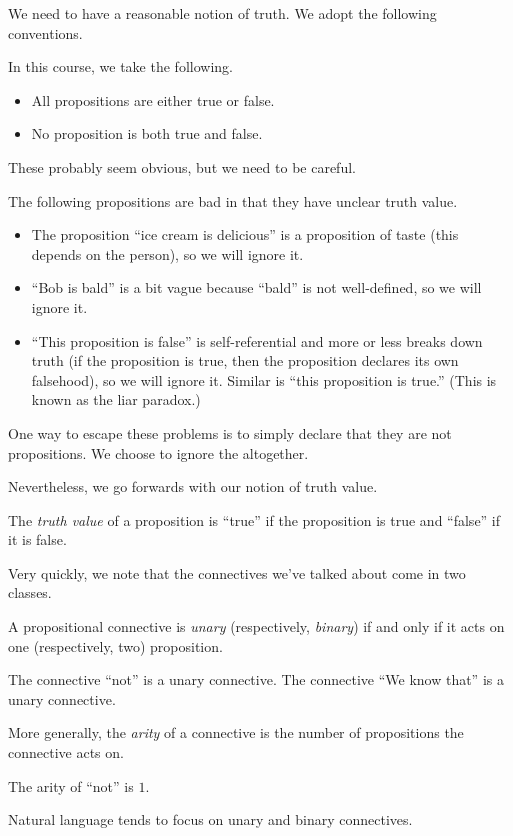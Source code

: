 \documentclass[../notes.tex]{subfiles}
\begin{document}
We need to have a reasonable notion of truth. We adopt the following conventions.
\begin{convention}
	In this course, we take the following.
	\begin{itemize}
		\item All propositions are either true or false.
		\item No proposition is both true and false.
	\end{itemize}
\end{convention}
These probably seem obvious, but we need to be careful.
\begin{example}
	The following propositions are bad in that they have unclear truth value.
	\begin{itemize}
		\item The proposition ``ice cream is delicious'' is a proposition of taste (this depends on the person), so we will ignore it.
		\item ``Bob is bald'' is a bit vague because ``bald'' is not well-defined, so we will ignore it.
		\item ``This proposition is false'' is self-referential and more or less breaks down truth (if the proposition is true, then the proposition declares its own falsehood), so we will ignore it. Similar is ``this proposition is true.'' (This is known as the liar paradox.)
	\end{itemize}
	One way to escape these problems is to simply declare that they are not propositions. We choose to ignore the altogether.
\end{example}
Nevertheless, we go forwards with our notion of truth value.
\begin{definition}
	The \textit{truth value} of a proposition is ``true'' if the proposition is true and ``false'' if it is false.
\end{definition}

Very quickly, we note that the connectives we've talked about come in two classes.
\begin{definition}
	A propositional connective is \textit{unary} (respectively, \textit{binary}) if and only if it acts on one (respectively, two) proposition.
\end{definition}
\begin{example}
	The connective ``not'' is a unary connective. The connective ``We know that'' is a unary connective.
\end{example}
\begin{definition}
	More generally, the \textit{arity} of a connective is the number of propositions the connective acts on.
\end{definition}
\begin{example}
	The arity of ``not'' is $1$.
\end{example}
Natural language tends to focus on unary and binary connectives.
\end{document}
